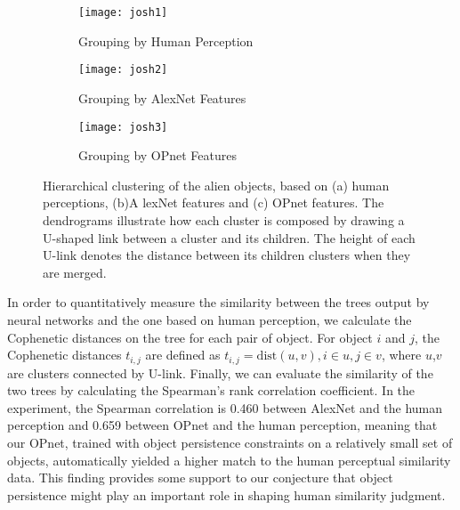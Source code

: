 \documentclass{article} %
\begin{document}
\begin{figure*}[t]
  \centering
  \begin{subfigure}{\linewidth}
  \texttt{[image: josh1]}
  \caption{Grouping by Human Perception}
  \label{fig:josh_human}
  \end{subfigure}\par\medskip
  \centering
  \begin{subfigure}{\linewidth}
  \texttt{[image: josh2]}
  \caption{Grouping by AlexNet Features}
  \label{fig:josh_pretrain}
  \end{subfigure}\par\medskip
  \begin{subfigure}{\linewidth}
  \centering
  \texttt{[image: josh3]}
  \caption{Grouping by OPnet Features}
  \label{fig:josh_triplet}
  \end{subfigure}
  \caption{Hierarchical clustering of the alien objects, based on (a) human perceptions, (b)A lexNet features and (c) OPnet features. The dendrograms illustrate how each cluster is composed by drawing a U-shaped link between a cluster and its children. The height of each U-link denotes the distance between its children clusters when they are merged.}
  \label{fig:josh_tree}
\end{figure*}

In order to quantitatively measure the similarity between the trees output by neural networks and the one based on human perception, we calculate the Cophenetic distances on the tree for each pair of object. For object $i$ and $j$, the Cophenetic distances $t_{i,j}$ are defined as $t_{i,j}=\mathrm{dist}(u,v), i\in u, j\in v$, where $u$,$v$ are clusters connected by U-link.
Finally, we can evaluate the similarity of the two trees by calculating the Spearman's rank correlation coefficient. In the experiment, the Spearman correlation is 0.460 between AlexNet and the human perception and 0.659 between OPnet and the human perception, meaning that our OPnet, trained with object persistence constraints on a relatively small set of objects, automatically yielded a higher match to the human perceptual similarity data. This  finding provides some support to our conjecture that  object persistence might play an important role in shaping human similarity judgment. 

\end{document}
